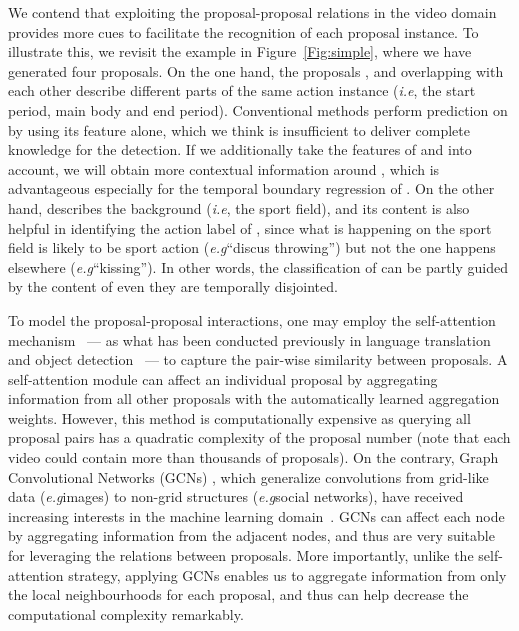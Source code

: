 \documentclass[10pt,twocolumn,letterpaper]{article}
\def\eg{\emph{e.g}\onedot} \def\Eg{\emph{E.g}\onedot}
\def\ie{\emph{i.e}\onedot} \def\Ie{\emph{I.e}\onedot}
\begin{document}
	We contend that exploiting the proposal-proposal relations in the video domain provides more cues to facilitate the recognition of each proposal instance. To illustrate this, we revisit the example in Figure~\ref{Fig:simple}, where we have generated four proposals. 
	On the one hand, the proposals ,  and  overlapping with each other describe different parts of the same action instance (\ie, the start period, main body and end period).
	Conventional methods perform prediction on  by using its feature alone, which we think is insufficient to deliver complete knowledge for the detection.
	If we additionally take the features of  and  into account, we will obtain more contextual information around , which is advantageous especially for the temporal boundary regression of .
	On the other hand,  describes the background (\ie, the sport field), and its content is also helpful in identifying the action label of , since what is happening on the sport field is likely to be sport action (\eg ``discus throwing'') but not the one happens elsewhere  (\eg ``kissing''). In other words, the classification of  can be partly guided by the content of  even they are temporally disjointed. 


	To model the proposal-proposal interactions, one may employ the self-attention mechanism~\cite{vaswani2017attention} --- as what has been conducted previously in language translation~\cite{vaswani2017attention} and object detection~\cite{hu2018relation} --- to capture the pair-wise similarity between proposals. 
	A self-attention module can affect an individual proposal by aggregating information from all other proposals with the automatically learned aggregation weights.
	However, this method is computationally expensive as querying all proposal pairs has a quadratic complexity of the proposal number (note that each video could contain more than thousands of proposals). On the contrary, Graph Convolutional Networks (GCNs) , which generalize convolutions from grid-like data (\eg images) to non-grid structures (\eg social networks), have received increasing interests in the machine learning domain~\cite{kipf2017semi,yan2018spatial}. GCNs can affect each node by aggregating information from the adjacent nodes, and thus are very suitable for leveraging the relations between proposals. More importantly, 
	unlike the self-attention strategy, 
	applying GCNs enables us to aggregate information from only the local neighbourhoods for each proposal, and thus can help decrease the computational complexity remarkably.
\end{document}
